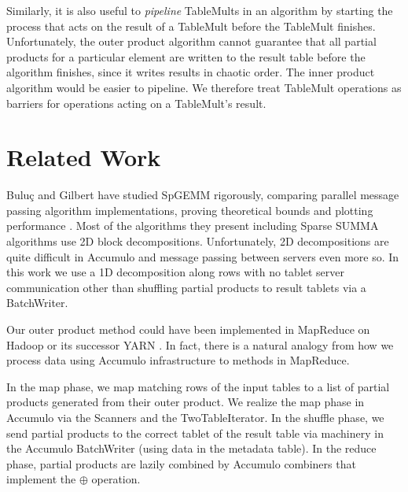 Similarly, it is also useful to \emph{pipeline} TableMults in an algorithm by starting the process 
that acts on the result of a TableMult before the TableMult finishes.
Unfortunately, the outer product algorithm cannot guarantee that all partial products for a particular element 
are written to the result table before the algorithm finishes, since it writes results in chaotic order.
The inner product algorithm would be easier to pipeline.
We therefore treat TableMult operations as barriers for operations acting on a TableMult's result.



\section{Related Work} %
Bulu\c{c} and Gilbert have studied SpGEMM rigorously, comparing parallel message passing 
algorithm implementations, proving theoretical bounds and plotting performance \cite{buluc2012parallel}.
Most of the algorithms they present including Sparse SUMMA algorithms use 2D block decompositions.
Unfortunately, 2D decompositions are quite difficult in Accumulo 
and message passing between servers even more so.
In this work we use a 1D decomposition along rows with no tablet server communication 
other than shuffling partial products to result tablets via a BatchWriter.

Our outer product method could have been implemented in MapReduce %
on Hadoop or its successor YARN \cite{vavilapalli2013apache}.
In fact, there is a natural analogy from
how we process data using Accumulo infrastructure to methods in MapReduce.

In the map phase, we map matching rows of the input tables to a list
of partial products generated from their outer product.
We realize the map phase in Accumulo via the Scanners and the TwoTableIterator.
In the shuffle phase, we send partial products to the correct tablet of the result
table via machinery in the Accumulo BatchWriter (using data in the metadata table).
In the reduce phase, partial products are lazily combined by Accumulo combiners 
that implement the $\oplus$ operation.

